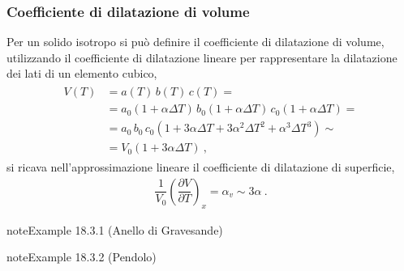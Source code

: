 \documentclass[letterpaper,10pt,italian]{jupyterBook}
\begin{document}
\subsubsection{Coefficiente di dilatazione di volume}
\label{\detokenize{ch/thermodynamics/elastic-solid-1d:coefficiente-di-dilatazione-di-volume}}
\sphinxAtStartPar
Per un solido isotropo si può definire il coefficiente di dilatazione di volume, utilizzando il coefficiente di dilatazione lineare per rappresentare la dilatazione dei lati di un elemento cubico,
\begin{equation*}
\begin{split}\begin{aligned}
  V(T)
  & = a(T) \, b(T) \, c(T) = \\
  & = a_0 (1 + \alpha \Delta T) \, b_0 (1 + \alpha \Delta T) \, c_0 (1+\alpha \Delta T) = \\ 
  & = a_0 \, b_0 \, c_0 (1 + 3 \alpha \Delta T + 3 \alpha^2 \Delta T^2 +  \alpha^3 \Delta T^3) \sim \\
  & = V_0 ( 1 + 3 \alpha \Delta T ) \ , 
\end{aligned}\end{split}
\end{equation*}
\sphinxAtStartPar
si ricava nell’approssimazione lineare il coefficiente di dilatazione di superficie,
\begin{equation*}
\begin{split} \dfrac{1}{V_0}\left(\dfrac{\partial V}{\partial T}\right)_x = \alpha_v \sim 3 \alpha \ .\end{split}
\end{equation*}\label{ch/thermodynamics/elastic-solid-1d:thermodynamics:elastic-solid:gravesande}
\begin{sphinxadmonition}{note}{Example 18.3.1 (Anello di Gravesande)}



\sphinxAtStartPar
{\hyperref[\detokenize{ch/thermodynamics/foundation-experiments:thermodynamics:history:th-expansion:gravesande}]{}}
\end{sphinxadmonition}
\label{ch/thermodynamics/elastic-solid-1d:thermodynamics:elastic-solid:pendulum}
\begin{sphinxadmonition}{note}{Example 18.3.2 (Pendolo)}


\end{sphinxadmonition}
\label{ch/thermodynamics/elastic-solid-1d:thermodynamics:elastic-solid:interference}
\end{document}

